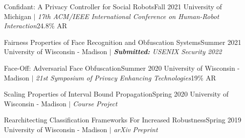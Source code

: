 
    \CVSubheading
      {Confidant: A Privacy Controller for Social Robots}{Fall 2021}
      {{University of Michigan} $|$ \emph{\small{17th ACM/IEEE International Conference on Human-Robot Interaction}}}{24.8\% AR}
      
    \CVSubheading
      {{Fairness Properties of Face Recognition and Obfuscation Systems}\cite{Fairness}}{Summer 2021}
      {{University of Wisconsin - Madison} $|$ \emph{\small{\textbf{Submitted:} USENIX Security 2022}}}{}


    \CVSubheading
      {{Face-Off: Adversarial Face Obfuscation}\cite{FaceOff}}{Summer 2020}
      {{University of Wisconsin - Madison} $|$ \emph{\small{21st Symposium of Privacy Enhancing Technologies}}}{19\% AR}

    \CVSubheading
      {Scaling Properties of Interval Bound Propagation}{Spring 2020}
      {{University of Wisconsin - Madison} $|$ \emph{\small{Course Project}}}{}

    \CVSubheading
      {{Rearchitecting Classification Frameworks For Increased Robustness}\cite{Robustness}}{Spring 2019}
      {{University of Wisconsin - Madison} $|$ \emph{\small{arXiv Preprint}}}{}

  \CVSubHeadingListEnd